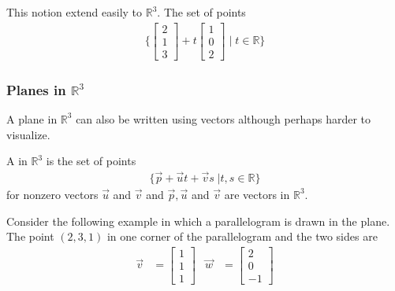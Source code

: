 This notion extend easily to $\mathbb{R}^3$.  The set of points
%
\begin{align*}
\{
\begin{bmatrix}
2 \\ 1 \\ 3
\end{bmatrix} + t \begin{bmatrix}
1 \\ 0 \\ 2
\end{bmatrix} \; | \; t \in \mathbb{R} \}
\end{align*}



\begin{center}
\end{center}

\subsubsection{Planes in $\mathbb{R}^3$}

A plane in $\mathbb{R}^3$ can also be written using vectors although perhaps harder to visualize.

\begin{definition}
A  in $\mathbb{R}^3$ is the set of points
%
\begin{align*}
\{ \vec{p} + \vec{u} t + \vec{v} s \; | t,s \in \mathbb{R} \}
\end{align*}
for nonzero vectors $\vec{u}$ and $\vec{v}$ and $\vec{p},\vec{u}$ and $\vec{v}$ are vectors in $\mathbb{R}^3$.
\end{definition}


Consider the following example in which a parallelogram is drawn in the plane.  The point $(2,3,1)$ in one corner of the parallelogram and the two sides are
%
\begin{align*}
\vec{v} & = \begin{bmatrix}
1 \\ 1 \\1
\end{bmatrix} & \vec{w} & = \begin{bmatrix}
2 \\ 0 \\ -1
\end{bmatrix}
\end{align*}

